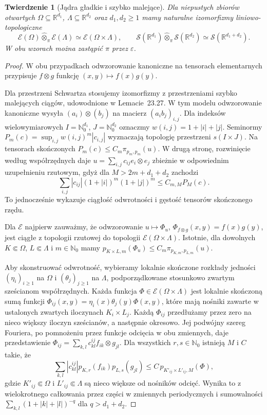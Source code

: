 \documentclass[11pt,a4paper]{article}
\numberwithin{equation}{section}
\theoremstyle{plain}
\newtheorem{twierdzenie}{Twierdzenie}[section]
\theoremstyle{definition}
\theoremstyle{remark}
\newcommand{\R}{\mathbb R}
\newcommand{\N}{\mathbb N}
\begin{document}
\begin{twierdzenie}[Jądra gładkie i szybko malejące]
\label{thm:smooth-schwartz-tensor24}
Dla niepustych zbiorów otwartych $\Omega\subseteq\R^{d_1}$,
$\Lambda\subseteq\R^{d_2}$ oraz $d_1,d_2\ge1$ mamy
naturalne izomorfizmy liniowo-topologiczne
\[
 \mathcal E(\Omega)\widehat\otimes_\pi\mathcal E(\Lambda)
 \simeq \mathcal E(\Omega\times\Lambda),\qquad
 \mathcal S(\R^{d_1})\widehat\otimes_\pi\mathcal S(\R^{d_2})
 \simeq \mathcal S(\R^{d_1+d_2}).
\]
W obu wzorach można zastąpić $\pi$ przez $\varepsilon$.
\end{twierdzenie}
\begin{proof}
W obu przypadkach odwzorowanie kanoniczne na tensorach
elementarnych przypisuje $f\otimes g$ funkcję
$(x,y)\mapsto f(x)g(y)$.

Dla przestrzeni Schwartza stosujemy izomorfizmy z
przestrzeniami szybko malejących ciągów, udowodnione
w Lemacie~\textup{23.27}. W tym modelu
odwzorowanie kanoniczne wysyła $(a_i)\otimes(b_j)$
na macierz $(a_i b_j)_{i,j}$. Dla indeksów wielowymiarowych
$I=\N_0^{d_1}$, $J=\N_0^{d_2}$ oznaczmy
$w(i,j)=1+|i|+|j|$. Seminormy
$P_m(c)=\sup_{i,j}w(i,j)^m|c_{i,j}|$ wyznaczają
topologię przestrzeni $s(I\times J)$. Na tensorach
skończonych $P_m(c)\le C_m\pi_{p_m,p_m}(u)$.
W drugą stronę, rozwinięcie według współrzędnych daje
$u=\sum_{i,j}c_{ij}e_i\otimes e_j$ zbieżnie w
odpowiednim uzupełnieniu rzutowym, gdyż dla
$M>2m+d_1+d_2$ zachodzi
\[
 \sum_{i,j}|c_{ij}|(1+|i|)^m(1+|j|)^m
 \le C_{m,M}P_M(c).
\]
To jednocześnie wykazuje ciągłość odwrotności i gęstość
tensorów skończonego rzędu.

Dla $\mathcal E$ najpierw zauważmy, że odwzorowanie
$u\mapsto\Phi_u$, $\Phi_{f\otimes g}(x,y)=f(x)g(y)$,
jest ciągłe z topologii rzutowej do topologii
$\mathcal E(\Omega\times\Lambda)$. Istotnie, dla dowolnych
$K\Subset\Omega$, $L\Subset\Lambda$ i $m\in\N_0$ mamy
$p_{K\times L,m}(\Phi_u)\le C_m\pi_{p_{K,m},p_{L,m}}(u)$.

Aby skonstruować odwrotność, wybieramy lokalnie skończone
rozkłady jedności $(\eta_i)_{i\ge1}$ na $\Omega$
i $(\theta_j)_{j\ge1}$ na $\Lambda$, podporządkowane
stosunkowo zwartym sześcianom współrzędnych.
Każda funkcja $\Phi\in\mathcal E(\Omega\times\Lambda)$
jest lokalnie skończoną sumą funkcji
$\Phi_{ij}(x,y)=\eta_i(x)\theta_j(y)\Phi(x,y)$,
które mają nośniki zawarte w ustalonych zwartych
iloczynach $K_i\times L_j$. Każdą $\Phi_{ij}$
przedłużamy przez zero na nieco większy iloczyn
sześcianów, a następnie okresowo. Jej podwójny szereg
Fouriera, po pomnożeniu przez funkcje odcięcia w obu
zmiennych, daje przedstawienie
$\Phi_{ij}=\sum_{k,l}c_{kl}^{ij}f_{ik}\otimes g_{jl}$.
Dla wszystkich $r,s\in\N_0$ istnieją $M$ i $C$ takie, że
\[
 \sum_{k,l}|c_{kl}^{ij}|p_{K,r}(f_{ik})p_{L,s}(g_{jl})
 \le C\,p_{K'_{ij}\times L'_{ij},M}(\Phi),
\]
gdzie $K'_{ij}\Subset\Omega$ i $L'_{ij}\Subset\Lambda$
są nieco większe od nośników odcięć. Wynika to z
wielokrotnego całkowania przez części w zmiennych
periodycznych i sumowalności
$\sum_{k,l}(1+|k|+|l|)^{-q}$ dla $q>d_1+d_2$.


\end{proof}
\end{document}
